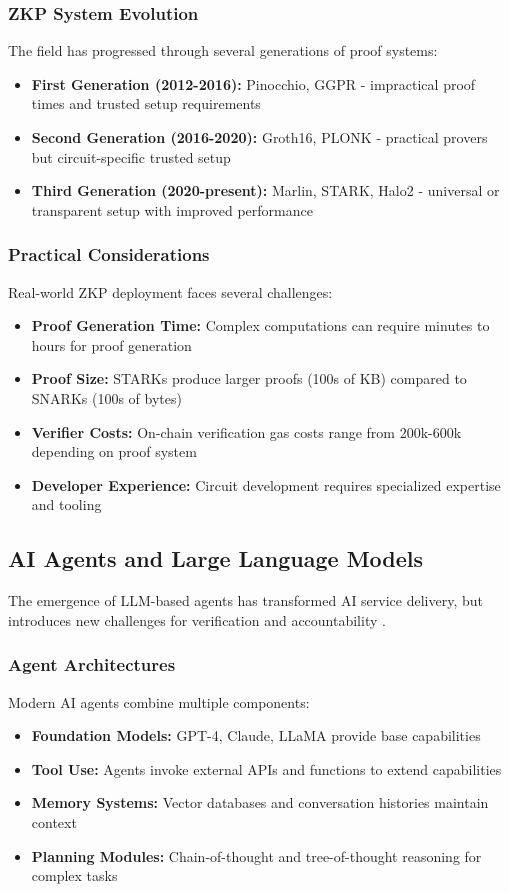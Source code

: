 \subsubsection{ZKP System Evolution}
The field has progressed through several generations of proof systems:
\begin{itemize}
    \item \textbf{First Generation (2012-2016):} Pinocchio, GGPR - impractical proof times and trusted setup requirements
    \item \textbf{Second Generation (2016-2020):} Groth16, PLONK - practical provers but circuit-specific trusted setup
    \item \textbf{Third Generation (2020-present):} Marlin, STARK, Halo2 - universal or transparent setup with improved performance \citep{chiesa2020marlin}
\end{itemize}

\subsubsection{Practical Considerations}
Real-world ZKP deployment faces several challenges:
\begin{itemize}
    \item \textbf{Proof Generation Time:} Complex computations can require minutes to hours for proof generation
    \item \textbf{Proof Size:} STARKs produce larger proofs (100s of KB) compared to SNARKs (100s of bytes)
    \item \textbf{Verifier Costs:} On-chain verification gas costs range from 200k-600k depending on proof system
    \item \textbf{Developer Experience:} Circuit development requires specialized expertise and tooling
\end{itemize}

\subsection{AI Agents and Large Language Models}

The emergence of LLM-based agents has transformed AI service delivery, but introduces new challenges for verification and accountability \citep{wang2023llmagents}.

\subsubsection{Agent Architectures}
Modern AI agents combine multiple components:
\begin{itemize}
    \item \textbf{Foundation Models:} GPT-4, Claude, LLaMA provide base capabilities
    \item \textbf{Tool Use:} Agents invoke external APIs and functions to extend capabilities
    \item \textbf{Memory Systems:} Vector databases and conversation histories maintain context
    \item \textbf{Planning Modules:} Chain-of-thought and tree-of-thought reasoning for complex tasks
\end{itemize}

